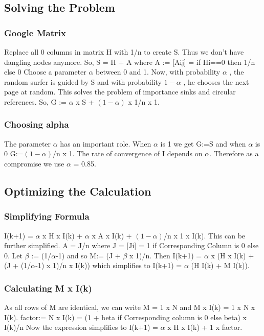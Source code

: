 \documentclass{article}
\begin{document}
    \subsection{Solving the Problem}
    \subsubsection{Google Matrix}
    Replace all 0 columns in matrix H with 1/n to create S. Thus we don't have dangling nodes anymore. \newline
    So, S = H + A where A := [Aij] = {if Hi==0 then 1/n else 0} \newline
    \newline
    Choose a parameter $\alpha$ between 0 and 1. Now, with probability $\alpha$ , the random surfer is guided by S and with probability $ 1-\alpha $ , he chooses the next page at random. This solves the problem of importance sinks and circular references.  \newline
    So, G := $\alpha$ x S + $(1-\alpha)$ x 1/n x 1.
    \subsubsection{Choosing alpha}
    The parameter $\alpha$ has an important role. When $\alpha$ is 1 we get G:=S and when $\alpha$ is 0 G:=$(1-\alpha)$/n x 1. The rate of convergence of I depends on $\alpha$. Therefore as a compromise we use $\alpha$ = 0.85.
    
    \subsection{Optimizing the Calculation}
    \subsubsection{Simplifying Formula}
    I(k+1) = $\alpha$ x H x I(k) + $\alpha$ x A x I(k) + $(1-\alpha)$/n x 1 x I(k). \newline
    This can be further simplified. A = J/n where J = [Ji] = {1 if Corresponding Column is 0 else 0}.\newline
    Let  $\beta$ := (1/$\alpha$-1) and so M:= (J + $\beta$ x 1)/n.  \newline
    Then I(k+1) = $\alpha$ x (H x I(k) + (J + (1/$\alpha$-1) x 1)/n x I(k)) which simplifies to \newline
    I(k+1) = $\alpha$ (H I(k) + M I(k)).
    \subsubsection{Calculating M x I(k)}
    As all rows of M are identical, we can write M = 1 x N and M x I(k) = 1 x N x I(k).  \newline
    factor:= N x I(k) = (1 + beta if Corresponding column is 0 else beta) x I(k)/n
    \newline Now the expression simplifies to 
    I(k+1) = $\alpha$ x H x I(k) + 1 x factor.  
    \clearpage
    
\end{document}
